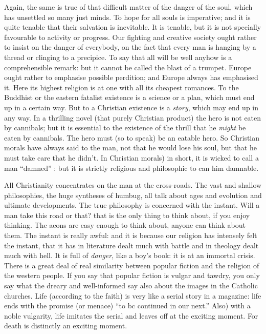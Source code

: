 \documentclass{book}
\begin{document}
Again, the same is true of that difficult matter of the danger of the soul, which has unsettled so many just minds. To hope for all souls is imperative; and it is quite tenable that their salvation is inevitable. It is tenable, but it is not specially favourable to activity or progress. Our fighting and creative society ought rather to insist on the danger of everybody, on the fact that every man is hanging by a thread or clinging to a precipice. To say that all will be well anyhow is a comprehensible remark: but it cannot be called the blast of a trumpet. Europe ought rather to emphasise possible perdition; and Europe always has emphasised it. Here its highest religion is at one with all its cheapest romances. To the Buddhist or the eastern fatalist existence is a science or a plan, which must end up in a certain way. But to a Christian existence is a \emph{story}, which may end up in any way. In a thrilling novel (that purely Christian product) the hero is not eaten by cannibals; but it is essential to the existence of the thrill that he \emph{might} be eaten by cannibals. The hero must (so to speak) be an eatable hero. So Christian morals have always said to the man, not that he would lose his soul, but that he must take care that he didn’t. In Christian morals) in short, it is wicked to call a man “damned” : but it is strictly religious and philosophic to can him damnable.

All Christianity concentrates on the man at the cross-roads. The vast and shallow philosophies, the huge syntheses of humbug, all talk about ages and evolution and ultimate developments. The true philosophy is concerned with the instant. Will a man take this road or that? that is the only thing to think about, if you enjoy thinking. The aeons are easy enough to think about, anyone can think about them. The instant is really awful: and it is because our religion has intensely felt the instant, that it has in literature dealt much with battle and in theology dealt much with hell. It is full of \emph{danger}, like a boy’s book: it is at an immortal crisis. There is a great deal of real similarity between popular fiction and the religion of the western people. If you say that popular fiction is vulgar and tawdry, you only say what the dreary and well-informed say also about the images in the Catholic churches. Life (according to the faith) is very like a serial story in a magazine: life ends with the promise (or menace) “to bc continued in our next.” Also) with a noble vulgarity, life imitates the serial and leaves off at the exciting moment. For death is distinctly an exciting moment.
\end{document}
